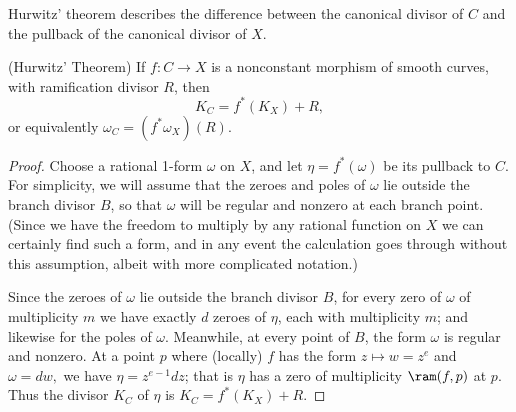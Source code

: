  Hurwitz' theorem describes the difference between the canonical divisor of $C$ and the pullback of the canonical divisor of $X$.
\begin{theorem}(Hurwitz' Theorem) \cite[Proposition IV.2.3]{H} \label{Hurwitz}
If $f:C\to X$ is a nonconstant morphism of smooth curves, with ramification divisor $R$, then 
$$
K_C = f^{*}(K_{X})+R,$$
or equivalently
$
\omega_{C} = (f^{*}\omega_{X})(R).
$
\end{theorem}
 
\begin{proof}
Choose a rational 1-form $\omega$ on $X$, and let $\eta = f^*(\omega)$ be its pullback to $C$. For simplicity, we will assume that the zeroes and poles of $\omega$ lie outside the branch divisor $B$, so that $\omega$ will be regular and nonzero at each branch point. (Since we have the freedom to multiply by any rational function on $X$ we can certainly find such a form, and in any event the calculation goes through without this assumption, albeit with more complicated notation.) 

Since the zeroes of $\omega$ lie outside the branch divisor $B$, for every zero of $\omega$ of multiplicity $m$ we have exactly $d$ zeroes of $\eta$, each with multiplicity $m$; and likewise for the poles of $\omega$. Meanwhile, at every point of $B$, the form $\omega$ is regular and nonzero. At a point $p$ where (locally) $f$ has the form $z \mapsto w = z^{e}$
and $\omega = dw,$ we have $\eta = z^{e-1}dz$; that is $\eta$ has a zero of multiplicity $\ram(f,p)$ at  $p$.
Thus the divisor $K_{C}$ of $\eta$ is
$K_{C} = f^{*}(K_{X})+R$.
\end{proof}


